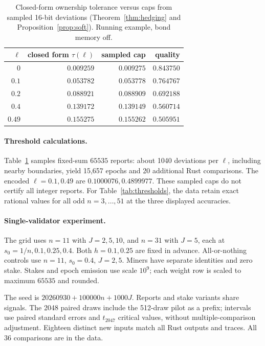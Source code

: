 \documentclass[sigconf,anonymous,review]{acmart}
\numberwithin{equation}{section}
\begin{document}
\begin{table}[t]
\caption{Closed-form ownership tolerance versus caps from sampled
16-bit deviations (Theorem~\ref{thm:hedging} and
Proposition~\ref{prop:soft}). Running example, bond memory off.}
\label{tab:replica}
\small
\begin{tabular}{@{}rrrr@{}}
\toprule
$\ell$ & closed form $\tau(\ell)$ & sampled cap & quality \\
\midrule
$0$ & $0.009259$ & $0.009275$ & $0.843750$ \\
$0.1$ & $0.053782$ & $0.053778$ & $0.764767$ \\
$0.2$ & $0.088921$ & $0.088909$ & $0.692188$ \\
$0.4$ & $0.139172$ & $0.139149$ & $0.560714$ \\
$0.49$ & $0.155275$ & $0.155262$ & $0.505951$ \\
\bottomrule
\end{tabular}
\end{table}

\paragraph{Threshold calculations.} Table~\ref{tab:replica} samples
fixed-sum $65535$ reports: about 1040 deviations per $\ell$, including
nearby boundaries, yield 15,657 epochs and 20 additional Rust comparisons.
The encoded $\ell=0.1,0.49$ are $0.1000076,0.4899977$.
These sampled caps do not certify all integer reports.
For Table~\ref{tab:thresholds}, the data retain exact rational values for
all odd $n=3,\ldots,51$ at the three displayed accuracies.

\paragraph{Single-validator experiment.} The grid uses $n=11$ with
$J=2,5,10$, and $n=31$ with $J=5$, each at $s_0=1/n,0.1,0.25,0.4$.
Both $h=0.1,0.25$ are fixed in advance. All-or-nothing controls use
$n=11$, $s_0=0.4$, $J=2,5$. Miners have separate identities and zero
stake. Stakes and epoch emission use scale $10^9$; each weight row is
scaled to maximum $65535$ and rounded.

The seed is $20260930+100000n+1000J$. Reports and stake variants share
signals. The 2048 paired draws include the 512-draw pilot as a prefix;
intervals use paired standard errors and $t_{2047}$ critical values,
without multiple-comparison adjustment. Eighteen distinct new inputs
match all Rust outputs and traces. All 36 comparisons are in the data.
\end{document}
